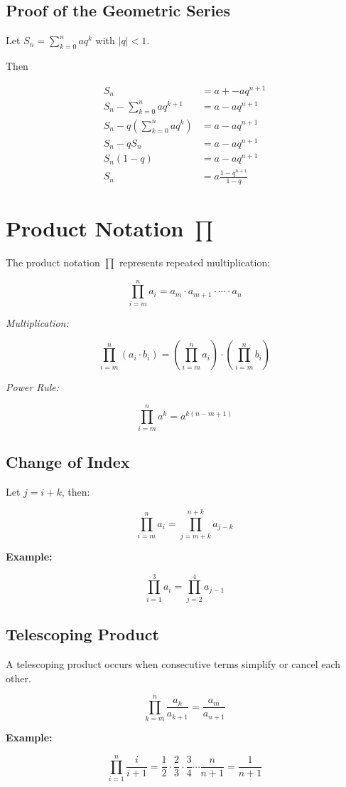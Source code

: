 \subsection{Proof of the Geometric Series}

Let \(S_n = \sum_{k = 0}^{n}aq^k\) with \(|q| < 1\).

Then 

\begin{align*} 
    S_n &= a +  - aq^{n + 1} \\ 
    S_n - \sum_{k = 0}^{n} aq^{k + 1} &= a - aq^{n + 1} \\
    S_n - q\left(\sum_{k = 0}^{n} aq^{k}\right) &= a - aq^{n + 1} \\
    S_n - qS_n &= a - aq^{n + 1} \\
    S_n(1 - q) &= a - aq^{n + 1} \\
    S_n &= a\frac{1 - q^{n + 1}}{1 - q}
\end{align*}

\QED

\section{Product Notation \texorpdfstring{\(\prod\)}{∏}}

The product notation \(\prod\) represents repeated multiplication:

\[
    \prod_{i = m}^{n} a_i = a_m \cdot a_{m+1} \cdot \cdots \cdot a_n
\]

\emph{Multiplication:}
    
\[
    \prod_{i = m}^{n} (a_i \cdot b_i) = \left( \prod_{i = m}^{n} a_i \right) \cdot \left( 
    \prod_{i = m}^{n} b_i \right)
\]

\emph{Power Rule:}
    
\[
    \prod_{i = m}^{n} a^k = a^{k(n - m + 1)}
\]

\subsection{Change of Index}

Let \(j = i + k\), then:

\[
    \prod_{i = m}^{n} a_i = \prod_{j = m + k}^{n + k} a_{j - k}
\]

\textbf{Example:}

\[
    \prod_{i = 1}^{3} a_i = \prod_{j = 2}^{4} a_{j - 1}
\]

\subsection{Telescoping Product}

A telescoping product occurs when consecutive terms simplify or cancel each other.

\[
    \prod_{k=m}^{n} \frac{a_k}{a_{k+1}} = \frac{a_m}{a_{n+1}}
\]

\textbf{Example:}

\[
    \prod_{i = 1}^{n} \frac{i}{i+1} = \frac{1}{2} \cdot \frac{2}{3} \cdot \frac{3}{4} \cdots 
    \frac{n}{n+1} = \frac{1}{n+1}
\]

